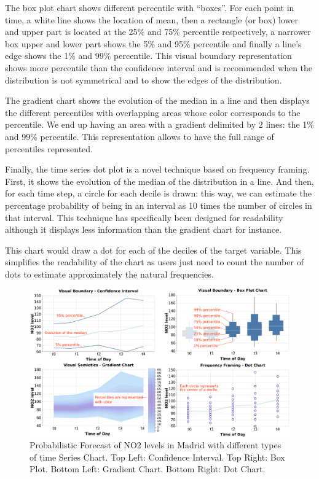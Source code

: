 \documentclass[a4paper,3p,sort&compress]{elsarticle}
\begin{document}
The box plot chart shows different percentile with “boxes”. For each point in time, a white 
line shows the location of mean, then a rectangle (or box) lower and upper part is located 
at the 25\% and 75\% percentile respectively, a narrower box upper and lower part shows 
the 5\% and 95\% percentile and finally a line’s edge shows the 1\% and 99\% percentile. 
This visual boundary representation shows more percentile than the confidence interval and 
is recommended when the distribution is not symmetrical and to show the edges of the distribution.

The gradient chart shows the evolution of the median in a line and then displays the different percentiles
with overlapping areas whose color corresponds to the percentile. We end up having an area with a gradient 
delimited by 2 lines: the 1\% and 99\% percentile. This representation allows to have the
 full range of percentiles represented.

Finally, the time series dot plot is a novel technique based on frequency framing. First, 
it shows the evolution of the median of the distribution in a line. And then, for each time 
step, a circle for each decile is drawn: this way, we can estimate the percentage 
probability of being in an interval as 10 times the number of circles in that interval. 
This technique has 
specifically been designed for readability although it displays less information than 
the gradient chart for instance.

This chart would draw a dot for each of the deciles of the target variable. This simplifies the 
readability of the chart as users just need to count the number of dots to estimate approximately 
the natural frequencies.



\begin{figure}
  \centering
  \includegraphics[width=.9\textwidth]{charts_vector} 
  \caption{\label{figure:charts} Probabilistic Forecast of NO2 levels in Madrid with different types of time Series Chart. 
  Top Left: Confidence Interval. Top Right: Box Plot. 
  Bottom Left: Gradient Chart. Bottom Right: Dot Chart.  }
\end{figure}
\end{document}
